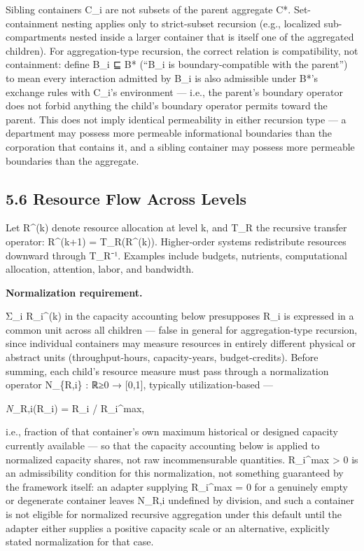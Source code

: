 \documentclass[
]{article}
\begin{document}
Sibling containers C\_i are not subsets of the parent aggregate C*.
Set-containment nesting applies only to strict-subset recursion (e.g.,
localized sub-compartments nested inside a larger container that is
itself one of the aggregated children). For aggregation-type recursion,
the correct relation is compatibility, not containment: define B\_i ⊑ B*
(``B\_i is boundary-compatible with the parent'') to mean every
interaction admitted by B\_i is also admissible under B*'s exchange
rules with C\_i's environment --- i.e., the parent's boundary operator
does not forbid anything the child's boundary operator permits toward
the parent. This does not imply identical permeability in either
recursion type --- a department may possess more permeable informational
boundaries than the corporation that contains it, and a sibling
container may possess more permeable boundaries than the aggregate.

\hypertarget{resource-flow-across-levels}{%
\subsection{5.6 Resource Flow Across
Levels}\label{resource-flow-across-levels}}

Let R\^{}(k) denote resource allocation at level k, and T\_R the
recursive transfer operator: R\^{}(k+1) = T\_R(R\^{}(k)). Higher-order
systems redistribute resources downward through T\_R⁻¹. Examples include
budgets, nutrients, computational allocation, attention, labor, and
bandwidth.

\textbf{Normalization requirement.}

Σ\_i R\_i\^{}(k) in the capacity accounting below presupposes R\_i is
expressed in a common unit across all children --- false in general for
aggregation-type recursion, since individual containers may measure
resources in entirely different physical or abstract units
(throughput-hours, capacity-years, budget-credits). Before summing, each
child's resource measure must pass through a normalization operator
N\_\{R,i\} : ℝ≥0 → {[}0,1{]}, typically utilization-based ---

\emph{N}\_R,i(R\_i) = R\_i / R\_i\^{}max,

i.e., fraction of that container's own maximum historical or designed
capacity currently available --- so that the capacity accounting below
is applied to normalized capacity shares, not raw incommensurable
quantities. R\_i\^{}max \textgreater{} 0 is an admissibility condition
for this normalization, not something guaranteed by the framework
itself: an adapter supplying R\_i\^{}max = 0 for a genuinely empty or
degenerate container leaves N\_R,i undefined by division, and such a
container is not eligible for normalized recursive aggregation under
this default until the adapter either supplies a positive capacity scale
or an alternative, explicitly stated normalization for that case.
\end{document}
